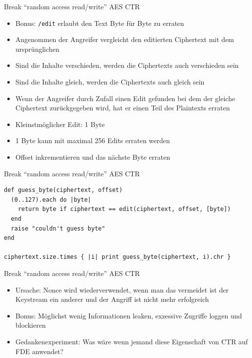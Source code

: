 \documentclass[presentation]{beamer}
\begin{document}
\begin{frame}[fragile,label={sec:orgb77955a}]{Break “random access read/write” AES CTR}
 \begin{itemize}
\item Bonus: \texttt{/edit} erlaubt den Text Byte für Byte zu erraten
\item Angenommen der Angreifer vergleicht den editierten Ciphertext mit
dem ursprünglichen
\item Sind die Inhalte verschieden, werden die Ciphertexts auch
verschieden sein
\item Sind die Inhalte gleich, werden die Ciphertexts auch gleich sein
\item Wenn der Angreifer durch Zufall einen Edit gefunden bei dem der
gleiche Ciphertext zurückgegeben wird, hat er einen Teil des
Plaintexts erraten
\item Kleinstmöglicher Edit: 1 Byte
\item 1 Byte kann mit maximal 256 Edits erraten werden
\item Offset inkrementieren und das nächste Byte erraten
\end{itemize}
\end{frame}

\begin{frame}[fragile,label={sec:org50636e0}]{Break “random access read/write” AES CTR}
 \begin{verbatim}
def guess_byte(ciphertext, offset)
  (0..127).each do |byte|
    return byte if ciphertext == edit(ciphertext, offset, [byte])
  end
  raise "couldn't guess byte"
end

ciphertext.size.times { |i| print guess_byte(ciphertext, i).chr }
\end{verbatim}
\end{frame}

\begin{frame}[label={sec:orga01e50d}]{Break “random access read/write” AES CTR}
\begin{itemize}
\item Ursache: Nonce wird wiederverwendet, wenn man das vermeidet ist der
Keystream ein anderer und der Angriff ist nicht mehr erfolgreich
\item Bonus: Möglichst wenig Informationen leaken, exzessive Zugriffe
loggen und blockieren
\item Gedankenexperiment: Was wäre wenn jemand diese Eigenschaft von CTR
auf FDE anwendet?
\end{itemize}
\end{frame}
\end{document}
